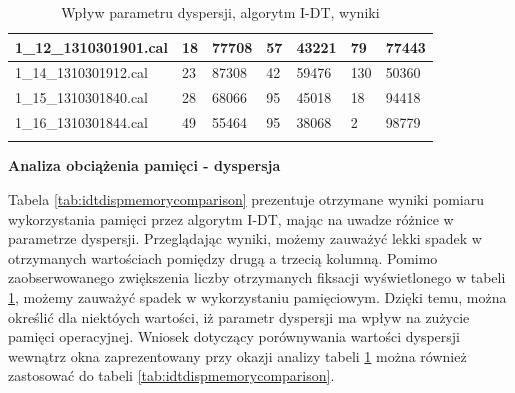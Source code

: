 {\begin{longtable}{|l|l|l|l|l|l|l|}
    1\_12\_1310301901.cal & 18 & \cellcolor[HTML]{EFEFEF}77708 & 57 & \cellcolor[HTML]{EFEFEF}43221 & 79 & \cellcolor[HTML]{EFEFEF}77443 \\ \hline
    1\_14\_1310301912.cal & 23 & \cellcolor[HTML]{EFEFEF}87308 & 42 & \cellcolor[HTML]{EFEFEF}59476 & 130 & \cellcolor[HTML]{EFEFEF}50360 \\ \hline
    1\_15\_1310301840.cal & 28 & \cellcolor[HTML]{EFEFEF}68066 & 95 & \cellcolor[HTML]{EFEFEF}45018 & 18 & \cellcolor[HTML]{EFEFEF}94418 \\ \hline
    1\_16\_1310301844.cal & 49 & \cellcolor[HTML]{EFEFEF}55464 & 95 & \cellcolor[HTML]{EFEFEF}38068 & 2 & \cellcolor[HTML]{EFEFEF}98779 \\ \hline
    \caption{Wpływ parametru dyspersji, algorytm I-DT, wyniki}
    \label{tab:idtdispfixcomparison}\\
\end{longtable}
}
\textbf{Analiza obciążenia pamięci - dyspersja}\par
Tabela \ref{tab:idtdispmemorycomparison} prezentuje otrzymane wyniki pomiaru wykorzystania pamięci przez algorytm I-DT, mając na uwadze różnice w parametrze dyspersji. Przeglądając wyniki, możemy zauważyć lekki spadek w otrzymanych wartościach pomiędzy drugą a trzecią kolumną. Pomimo zaobserwowanego zwiększenia liczby otrzymanych fiksacji wyświetlonego w tabeli \ref{tab:idtdispfixcomparison}, możemy zauważyć spadek w wykorzystaniu pamięciowym. Dzięki temu, można określić dla niektóych wartości, iż parametr dyspersji ma wpływ na zużycie pamięci operacyjnej. Wniosek dotyczący porównywania wartości dyspersji wewnątrz okna zaprezentowany przy okazji analizy tabeli \ref{tab:idtdispfixcomparison} można również zastosować do tabeli \ref{tab:idtdispmemorycomparison}.\par
